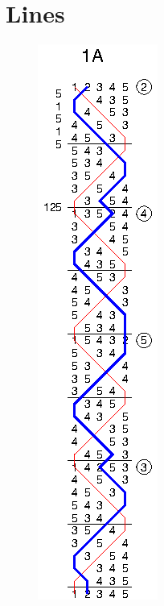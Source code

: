\chapter{Lines} \label{cha:lines}

\begin{figure}[h]
  \centering
  \includegraphics{figs/methods/single-hunt/1A}
\end{figure}


